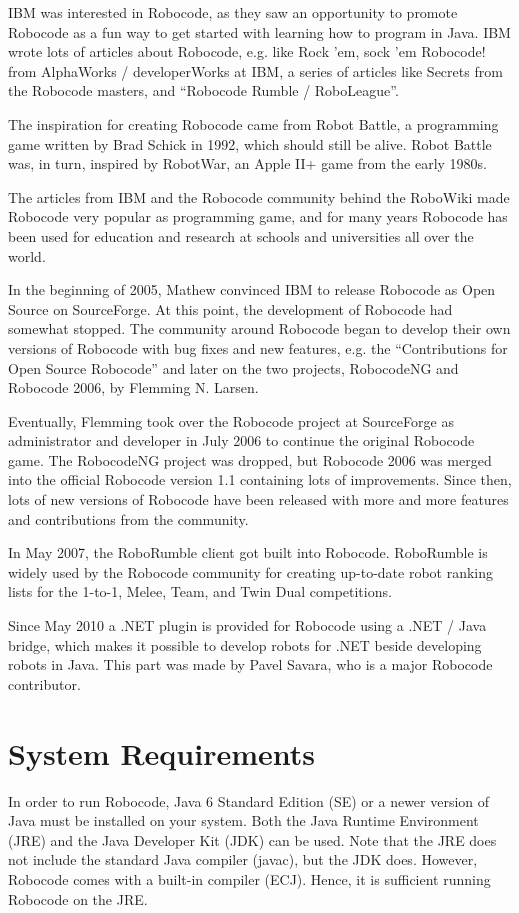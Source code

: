 \documentclass{scrreprt}
\begin{document}
IBM was interested in Robocode, as they saw an opportunity to promote Robocode as a fun way to get started with learning how to program in Java. IBM wrote lots of articles about Robocode, e.g. like Rock 'em, sock 'em Robocode! from AlphaWorks / developerWorks at IBM, a series of articles like Secrets from the Robocode masters, and ``Robocode Rumble / RoboLeague''.

The inspiration for creating Robocode came from Robot Battle, a programming game written by Brad Schick in 1992, which should still be alive. Robot Battle was, in turn, inspired by RobotWar, an Apple II+ game from the early 1980s.

The articles from IBM and the Robocode community behind the RoboWiki made Robocode very popular as programming game, and for many years Robocode has been used for education and research at schools and universities all over the world.

In the beginning of 2005, Mathew convinced IBM to release Robocode as Open Source on SourceForge. At this point, the development of Robocode had somewhat stopped. The community around Robocode began to develop their own versions of Robocode with bug fixes and new features, e.g. the ``Contributions for Open Source Robocode'' and later on the two projects, RobocodeNG and Robocode 2006, by Flemming N. Larsen.

Eventually, Flemming took over the Robocode project at SourceForge as administrator and developer in July 2006 to continue the original Robocode game. The RobocodeNG project was dropped, but Robocode 2006 was merged into the official Robocode version 1.1 containing lots of improvements. Since then, lots of new versions of Robocode have been released with more and more features and contributions from the community.

In May 2007, the RoboRumble client got built into Robocode. RoboRumble is widely used by the Robocode community for creating up-to-date robot ranking lists for the 1-to-1, Melee, Team, and Twin Dual competitions.

Since May 2010 a .NET plugin is provided for Robocode using a .NET / Java bridge, which makes it possible to develop robots for .NET beside developing robots in Java. This part was made by Pavel Savara, who is a major Robocode contributor.

\section{System Requirements}
In order to run Robocode, Java 6 Standard Edition (SE) or a newer version of Java must be installed on your system. Both the Java Runtime Environment (JRE) and the Java Developer Kit (JDK) can be used. Note that the JRE does not include the standard Java compiler (javac), but the JDK does. However, Robocode comes with a built-in compiler (ECJ). Hence, it is sufficient running Robocode on the JRE.
\end{document}
